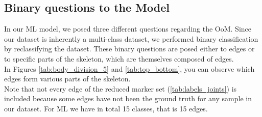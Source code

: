\subsection{Binary questions to the Model}
In our ML model, we posed three different questions regarding the OoM. 
Since our dataset is inherently a multi-class dataset, we performed binary classification by reclassifying the dataset.
These binary questions are posed either to edges or to specific parts of the skeleton, which are themselves composed of edges. \\
In Figures \ref{tab:body_division_5} and \ref{tab:top_bottom}, you can observe which edges form various parts of the skeleton. \\
Note that not every edge of the reduced marker set (\ref{tab:labels_joints}) is included because some edges have not been the ground truth for any sample in our dataset.
For ML we have in total 15 classes, that is 15 edges.

